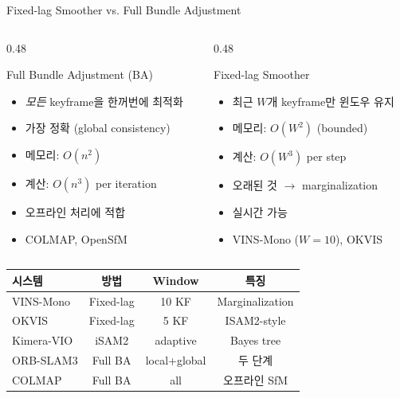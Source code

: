 \begin{frame}{Fixed-lag Smoother vs. Full Bundle Adjustment}
  \begin{columns}[T]
    \begin{column}{0.48\textwidth}
      \begin{block}{Full Bundle Adjustment (BA)}
        \begin{itemize}
          \item \emph{모든} keyframe을 한꺼번에 최적화
          \item 가장 정확 (global consistency)
          \item 메모리: $O(n^2)$
          \item 계산: $O(n^3)$ per iteration
          \item 오프라인 처리에 적합
          \item COLMAP, OpenSfM
        \end{itemize}
      \end{block}
    \end{column}
    \begin{column}{0.48\textwidth}
      \begin{block}{Fixed-lag Smoother}
        \begin{itemize}
          \item 최근 $W$개 keyframe만 윈도우 유지
          \item 메모리: $O(W^2)$ (bounded)
          \item 계산: $O(W^3)$ per step
          \item 오래된 것 $\to$ marginalization
          \item 실시간 가능
          \item VINS-Mono ($W=10$), OKVIS
        \end{itemize}
      \end{block}
    \end{column}
  \end{columns}
  \pause
  \vspace{0.4em}
  \begin{center}
  \begin{tabular}{lccc}
    \toprule
    \textbf{시스템} & \textbf{방법} & \textbf{Window} & \textbf{특징} \\
    \midrule
    VINS-Mono & Fixed-lag & 10 KF & Marginalization \\
    OKVIS & Fixed-lag & 5 KF & ISAM2-style \\
    Kimera-VIO & iSAM2 & adaptive & Bayes tree \\
    ORB-SLAM3 & Full BA & local+global & 두 단계 \\
    COLMAP & Full BA & all & 오프라인 SfM \\
    \bottomrule
  \end{tabular}
  \end{center}
\end{frame}

